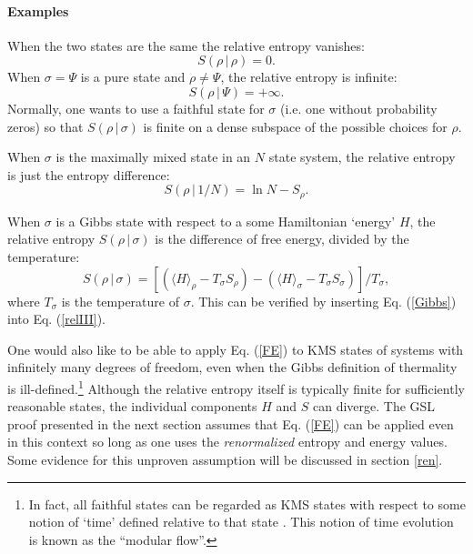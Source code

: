 \documentclass{article}
\begin{document}
\paragraph{Examples} When the two states are the same the relative entropy vanishes:
\begin{equation}
S(\rho\,|\,\rho) = 0.
\end{equation}
When $\sigma = \Psi$ is a pure state and $\rho \ne \Psi$, the relative entropy is infinite:
\begin{equation}
S(\rho\,|\,\Psi) = +\infty.
\end{equation}
Normally, one wants to use a faithful state for $\sigma$ (i.e. one without probability zeros) so that $S(\rho\,|\,\sigma)$ is finite on a dense subspace of the possible choices for $\rho$.

When $\sigma$ is the maximally mixed state in an $N$ state system, the relative entropy is just the entropy difference:
\begin{equation}
S(\rho\,|\,1/N) = \ln N - S_\rho.
\end{equation}

When $\sigma$ is a Gibbs state with respect to a some Hamiltonian `energy' $H$, the relative entropy $S (\rho\,|\,\sigma)$ is the difference of free energy, divided by the temperature:
\begin{equation}\label{FE}
S(\rho\,|\,\sigma) = [(\langle H \rangle_\rho - T_\sigma S_\rho) - (\langle H \rangle_\sigma - T_\sigma S_\sigma)]/T_\sigma,
\end{equation}
where $T_\sigma$ is the temperature of $\sigma$.  This can be verified by inserting Eq. (\ref{Gibbs}) into Eq. (\ref{relIII}).

One would also like to be able to apply Eq. (\ref{FE}) to KMS states of systems with infinitely many degrees of freedom, even when the Gibbs definition of thermality is ill-defined.\footnote{In fact, all faithful states can be regarded as KMS states with respect to some notion of `time' defined relative to that state \cite{summers05}.  This notion of time evolution is known as the ``modular flow''.}  Although the relative entropy itself is typically finite for sufficiently reasonable states, the individual components $H$ and $S$ can diverge.  The GSL proof presented in the next section assumes that Eq. (\ref {FE}) can be applied even in this context so long as one uses the \emph{renormalized} entropy and energy values.  Some evidence for this unproven assumption will be discussed in section \ref{ren}.
\end{document}
